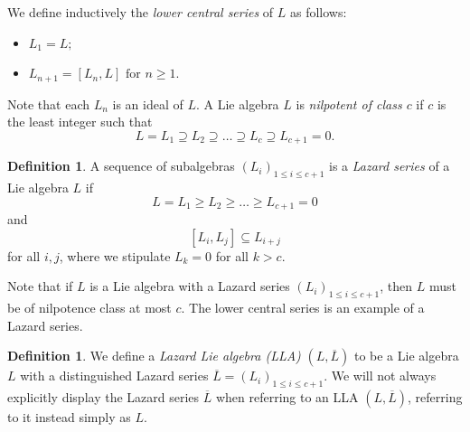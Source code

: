 \documentclass[psamsfonts]{amsart}
\theoremstyle{definition}
\newtheorem{defn}[thm]{Definition}
\theoremstyle{definition}
\theoremstyle{remark}
\numberwithin{equation}{section}
\begin{document}
We define inductively the \textit{lower central series} of $L$ as follows:
    \begin{itemize}
        \item $L_1 = L;$
        \item $L_{n+1} = [L_n,L] \textrm{ for } n\geq 1.$
    \end{itemize}
Note that each $L_n$ is an ideal of $L$. A Lie algebra $L$ is \textit{nilpotent of class $c$} if $c$ is the least integer such that
    \[L = L_1\supseteq L_2\supseteq \ldots \supseteq L_c \supseteq L_{c+1} = 0.\]

\begin{defn}
A sequence of subalgebras $(L_{i})_{1 \leq i \leq c+1}$ is a \emph{Lazard series} of a Lie algebra $L$ if 
$$
L = L_{1} \geq L_{2} \geq \ldots \geq L_{c+1} = 0
$$
and
$$
[L_{i},L_{j}] \subseteq L_{i+j}
$$
for all $i,j$, where we stipulate $L_k = 0$ for all $k > c$.  
\end{defn}

Note that if $L$ is a Lie algebra with a Lazard series $(L_{i})_{1 \leq i \leq c+1}$, then $L$ must be of nilpotence class at most $c$.  The lower central series is an example of a Lazard series. 

\begin{defn}
    We define a \emph{Lazard Lie algebra (LLA)} $(L,\overline{L})$ to be a Lie algebra $L$ with a distinguished Lazard series $\overline{L} = (L_{i})_{1 \leq i \leq c+1}$.  We will not always explicitly display the Lazard series $\overline{L}$ when referring to an LLA $(L,\overline{L})$, referring to it instead simply as $L$.  
\end{defn}
\end{document}
